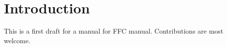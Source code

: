 \chapter{Introduction}

This is a first draft for a manual for FFC manual. Contributions are most welcome.
